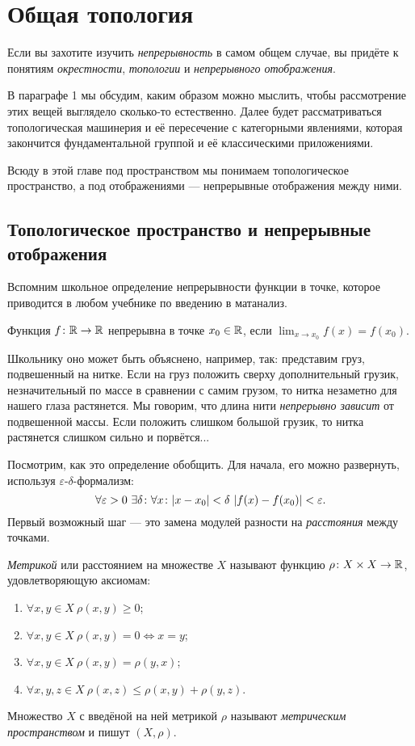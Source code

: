 \section{Общая топология}
Если вы захотите изучить \textit{непрерывность} в самом общем случае, вы придёте к понятиям \textit{окрестности}, \textit{топологии} и \textit{непрерывного отображения}.

В параграфе 1 мы обсудим, каким образом можно мыслить, чтобы рассмотрение этих вещей выглядело сколько-то естественно. Далее будет рассматриваться топологическая машинерия и её пересечение с категорными явлениями, которая закончится фундаментальной группой и её классическими приложениями. 

Всюду в этой главе под пространством мы понимаем топологическое пространство, а под отображениями --- непрерывные отображения между ними.

\subsection{Топологическое пространство и непрерывные отображения}
Вспомним школьное определение непрерывности функции в точке, которое приводится в любом учебнике по введению в матанализ.
\begin{defin}
	Функция $f\colon\mathbb {R}\to\mathbb {R}$ непрерывна в точке $x_0\in\mathbb {R}$, если $\displaystyle\lim_{x\to x_0} f(x)=f(x_0)$.
\end{defin}
Школьнику оно может быть объяснено, например, так: представим груз, подвешенный на нитке. Если на груз положить сверху дополнительный грузик, незначительный по массе в сравнении с самим грузом, то нитка незаметно для нашего глаза растянется. Мы говорим, что длина нити \textit{непрерывно зависит} от подвешенной массы. Если положить слишком большой грузик, то нитка растянется слишком сильно и порвётся...

Посмотрим, как это определение обобщить. Для начала, его можно развернуть, используя $\varepsilon$-$\delta$-формализм:
	\begin{equation}
		\forall\varepsilon>0\ \exists\delta\such\forall x\such |x-x_0|<\delta\ |f(x)-f(x_0)|<\varepsilon.
	\end{equation}
Первый возможный шаг --- это замена модулей разности на \textit{расстояния} между точками.
\begin{defin}
	\textit{Метрикой} или расстоянием на множестве $X$ называют функцию $\rho\colon X\times X\to\mathbb {R}$, удовлетворяющую аксиомам:
		\begin{enumerate}
			\item $\forall x,y\in X\ \rho(x,y)\geqslant 0$;
			\item $\forall x,y\in X\ \rho(x,y)=0\Leftrightarrow x=y$;
			\item $\forall x,y\in X\ \rho(x,y)=\rho(y,x)$;
			\item $\forall x,y,z\in X\ \rho(x,z)\leqslant\rho(x,y)+\rho(y,z)$.
		\end{enumerate}
Множество $X$ с введёной на ней метрикой $\rho$ называют \textit{метрическим пространством} и пишут $(X,\rho)$.
\end{defin}

